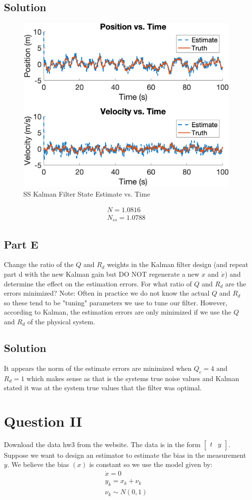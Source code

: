 \documentclass{article}
\begin{document}
\subsection*{Solution}
\begin{figure}[H]
    \centering
    \includegraphics[width=0.75\linewidth]{../figures/p1d.png}
    \caption{SS Kalman Filter State Estimate vs. Time}\label{fig:p1d}
\end{figure}
\begin{gather*}
    N = 1.0816\\
    N_{ss} = 1.0788
\end{gather*}

\subsection*{Part E}
Change the ratio of the $Q$ and $R_d$ weights in the Kalman filter design (and repeat 
part d with the new Kalman gain but DO NOT regenerate a new $x$ and $\dot{x}$) and 
determine the effect on the estimation errors.  For what ratio of $Q$ and $R_d$ are 
the errors minimized?  Note: Often in practice we do not know the actual $Q$ and $R_d$
so these tend to be "tuning" parameters we use to tune our filter. However, according 
to Kalman, the estimation errors are only minimized if we use the $Q$ and $R_d$ of the 
physical system.
\subsection*{Solution}
It appears the norm of the estimate errors are minimized when $Q_c=4$ and $R_d=1$ which makes sense as that is the systems true noise values and 
Kalman stated it was at the system true values that the filter was optimal.

\section*{Question II}
Download the data hw3 from the website.  The data is in the form 
$\begin{bmatrix} t & y \end{bmatrix}$.  Suppose we want to design an estimator to 
estimate the bias in the measurement $y$.  We believe the bias $(x)$ is constant so we 
use the model given by:
\begin{gather}
    \dot{x} = 0\\
    y_k = x_k + \nu_k\\
    \nu_k\sim N(0,1)
\end{gather}
\end{document}
